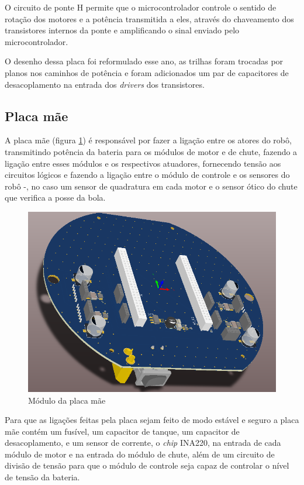 \documentclass[conference]{IEEEtran}
\begin{document}
O circuito de ponte H permite que o microcontrolador controle o sentido de rotação dos motores e a potência transmitida a eles, através do chaveamento dos transistores internos da ponte e amplificando o sinal enviado pelo microcontrolador.

O desenho dessa placa foi reformulado esse ano, as trilhas foram trocadas por planos nos caminhos de potência e foram adicionados um par de capacitores de desacoplamento na entrada dos \textit{drivers} dos transistores.

\subsection{Placa mãe}

A placa mãe (figura \ref{img:moduloplacamae}) é responsável por fazer a ligação entre os atores do robô, transmitindo potência da bateria para os módulos de motor e de chute, fazendo a ligação entre esses módulos e os respectivos atuadores, fornecendo tensão aos circuitos lógicos e fazendo a ligação entre o módulo de controle e os sensores do robô -, no caso um sensor de quadratura em cada motor e o sensor ótico do chute que verifica a posse da bola. 

\begin{figure}[thpb]	
	\centering
	\includegraphics[width=\linewidth]{img/moduloplacamae}
	\caption{Módulo da placa mãe}
	\label{img:moduloplacamae}
\end{figure}

Para que as ligações feitas pela placa sejam feito de modo estável e seguro a placa mãe contém um fusível, um capacitor de tanque, um capacitor de desacoplamento, e um sensor de corrente, o \textit{chip} INA220, na entrada de cada módulo de motor e na entrada do módulo de chute, além de um circuito de divisão de tensão para que o módulo de controle seja capaz de controlar o nível de tensão da bateria.
\end{document}
